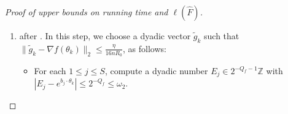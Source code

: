 \documentclass[11pt,reqno,letterpaper]{amsart}
\numberwithin{equation}{section}
\theoremstyle{definition}
\theoremstyle{remark}
\newcommand{\norm}[1]{\lVert #1\rVert}
\begin{document}
\begin{proof}[Proof of upper bounds on running time and $\ell(\widehat F)$]
\begin{enumerate}[leftmargin=*]
\begin{itemize}[leftmargin=*]
\textit{Running time.} Combining the bit length bounds in (1), we get that this takes $\text{poly}(n,p,Q_d,R_0)$ time. The resulting $\overline g_k$ has $\ell(\overline g_k(v))\leq \text{poly}(\log n, p,Q_d,R_0)$ pointwise.

\item Round $\overline g_k$ to the nearest dyadic vector $\widetilde g_k\in (2^{-P-1}\mathbb Z)^{2n}$, with $|\widetilde g_k(v)-\overline g_k(v)|\leq 2^{-P}\leq\epsilon_0$.


\textit{Running time.} This takes $\text{poly}(n,p,Q_d,R_0,P)$ time.

    \end{itemize}

\noindent \textit{Correctness.} 
Recall that
$d_v(\theta_k)>5K/16$ and
$\widehat d_v(\theta_k)\ge d_v(\theta_k)-n\omega>K/4$.
The coordinate at $v$ equals $1$ both in $\widetilde g_k$ and in $\nabla\log d_v(\theta_k)$, and the coordinates outside $\{v\}\cup\{u:u\sim v\}$ equal $0$ in both vectors.
For every  $u\sim v$, we have
\begin{align*}
 \left|\overline g_k(u)-
       (\nabla\log d_v(\theta_k))_u\right|
 &=
 \left|\frac{C_{uv}\widehat x_{uv}}{\widehat d_v(\theta_k)}
       -\frac{w_{uv}(\theta_k)}{d_v(\theta_k)}\right|\\
 &\le
 \frac{|C_{uv}\widehat x_{uv}-w_{uv}(\theta_k)|}
      {\widehat d_v(\theta_k)}
 +\frac{w_{uv}(\theta_k)}{d_v(\theta_k)}
  \frac{|d_v(\theta_k)-\widehat d_v(\theta_k)|}
       {\widehat d_v(\theta_k)}\\
 &\le\frac{(n+1)\omega}{d_v(\theta_k)-n\omega}
 \le\frac{(n+1)\epsilon_0}{16n}
 \le\frac{\epsilon_0}{8}.
\end{align*}
Hence $\|\overline g_k-\nabla\log d_v(\theta_k)\|_2\leq \sqrt{n}\cdot \frac{\epsilon_0}{8}$. Together with  $\|\widetilde g_k-\overline g_k\|_2\leq \sqrt{2n}\cdot\epsilon_0$, this gives $\|\widetilde g_k-\nabla\log d_v(\theta_k)\|_2\leq 2\sqrt{n}\epsilon_0\leq\frac{\eta}{16nR_0}$.

    \item {} after . In this step, we choose a dyadic vector $\widetilde g_k$ such that $\norm{\widetilde g_k-\nabla f(\theta_k)}_2\le\frac{\eta}{16nR_0}$, as follows:
    \begin{itemize}[leftmargin=*]
        \item For each $1\le j\le S$, compute a dyadic number $E_j\in 2^{-Q_f-1}\mathbb Z$ with
$|E_j-e^{b_j\cdot\theta_k}|\le 2^{-Q_f}\leq \omega_2$.


\end{itemize}
\end{enumerate}
\end{proof}
\end{document}
